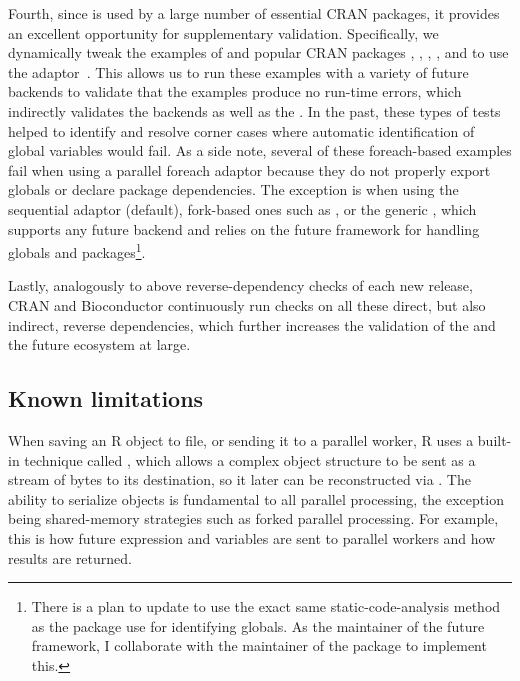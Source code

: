 Fourth, since  is used by a large number of essential
CRAN packages, it provides an excellent opportunity for supplementary
validation. Specifically, we dynamically tweak the examples of
 and popular CRAN packages ,
, , , and  to use
the  adaptor~\citep{CRAN:doFuture}.  This allows us
to run these examples with a variety of future backends to validate
that the examples produce no run-time errors, which indirectly
validates the backends as well as the .  In the past,
these types of tests helped to identify and resolve corner cases where
automatic identification of global variables would fail.  As a side
note, several of these foreach-based examples fail when using a
parallel foreach adaptor because they do not properly export globals
or declare package dependencies.  The exception is when using the
sequential
 adaptor (default), fork-based ones such as , or
the generic , which supports any future backend and
relies on the future framework for handling globals and
packages\footnote{There is a plan to update  to use the
exact same static-code-analysis method as the  package use
for identifying globals.  As the maintainer of the future framework, I
collaborate with the maintainer of the  package to
implement this.}.

Lastly, analogously to above reverse-dependency checks of each new
release, CRAN and Bioconductor continuously run checks on all these
direct, but also indirect, reverse dependencies, which further
increases the validation of the  and the future
ecosystem at large.


\subsection{Known limitations}
\label{known-limitations}

When saving an R object to file, or sending it to a parallel worker, R
uses a built-in technique called , which allows a
complex object structure to be sent as a stream of bytes to its
destination, so it later can be reconstructed
via .  The ability to serialize objects is
fundamental to all parallel processing, the exception being
shared-memory strategies such as forked parallel processing.  For
example, this is how future expression and variables are sent to
parallel workers and how results are returned.

